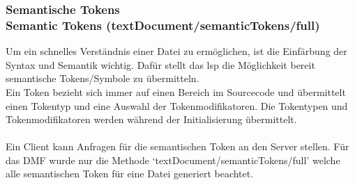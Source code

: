 \documentclass[./einleitung.tex]{subfiles}
\begin{document}
    \subsubsection[Semantische Tokens]{Semantische Tokens\\ {\textnormal{\footnotesize Semantic Tokens (textDocument/semanticTokens/full) \cite{semantic}}}}\label{subsubsec:semantic}
    Um ein schnelles Verständnis einer Datei zu ermöglichen, ist die Einfärbung der Syntax und Semantik wichtig.
    Dafür stellt das \acrshort{lsp} die Möglichkeit bereit semantische Tokens/Symbole zu übermitteln.\\
    Ein Token bezieht sich immer auf einen Bereich im Sourcecode und übermittelt einen Tokentyp und eine Auswahl der Tokenmodifikatoren.
    Die Tokentypen und Tokenmodifikatoren werden während der Initialisierung übermittelt.
    \\\\
    Ein Client kann Anfragen für die semantischen Token an den Server stellen.
    Für das DMF wurde nur die Methode `textDocument/semanticTokens/full' welche alle semantischen Token für eine Datei generiert beachtet.
\end{document}
